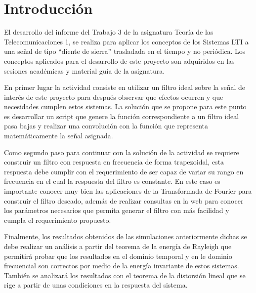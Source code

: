 \section{Introducción}\label{sec:introduccion}
El desarrollo del informe del Trabajo 3 de la asignatura Teoría de las Telecomunicaciones 1, se realiza para aplicar los conceptos de los Sistemas LTI a una señal de tipo ``diente de sierra'' trasladada en el tiempo y no periódica. Los conceptos aplicados para el desarrollo de este proyecto son adquiridos en las sesiones académicas y material guía de la asignatura.

En primer lugar la actividad consiste en utilizar un filtro ideal sobre la señal de interés de este proyecto para después observar que efectos ocurren y que necesidades cumplen estos sistemas. La solución que se propone para este punto es desarrollar un script que genere la función correspondiente a un filtro ideal pasa bajas y realizar una convolución con la función que representa matemáticamente la señal asignada.

Como segundo paso para continuar con la solución de la actividad se requiere construir un filtro con respuesta en frecuencia de forma trapezoidal, esta respuesta debe cumplir con el requerimiento de ser capaz de variar su rango en frecuencia en el cual la respuesta del filtro es constante. En este caso es importante conocer muy bien las aplicaciones de la Transformada de Fourier para construir el filtro deseado, además de realizar consultas en la web para conocer los parámetros necesarios que permita generar el filtro con más facilidad y cumpla el requerimiento propuesto.

Finalmente, los resultados obtenidos de las simulaciones anteriormente dichas se debe realizar un análisis a partir del teorema de la energía de Rayleigh que permitirá probar que los resultados en el dominio temporal y en le dominio frecuencial son correctos por medio de la energía invariante de estos sistemas. También se analizará los resultados con el teorema de la distorsión lineal que se rige a partir de unas condiciones en la respuesta del sistema.
